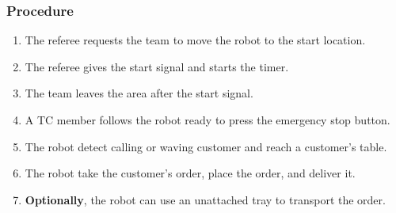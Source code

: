 \subsubsection*{Procedure}

\begin{enumerate}
	\item The referee requests the team to move the robot to the start location.
	\item The referee gives the start signal and starts the timer.
	\item The team leaves the area after the start signal.
	\item A TC member follows the robot ready to press the emergency stop button. 
	\item The robot detect calling or waving customer and reach a customer's table.
	\item The robot take the customer's order, place the order, and deliver it.
	\item \textbf{Optionally}, the robot can use an unattached tray to transport the order.
\end{enumerate}


